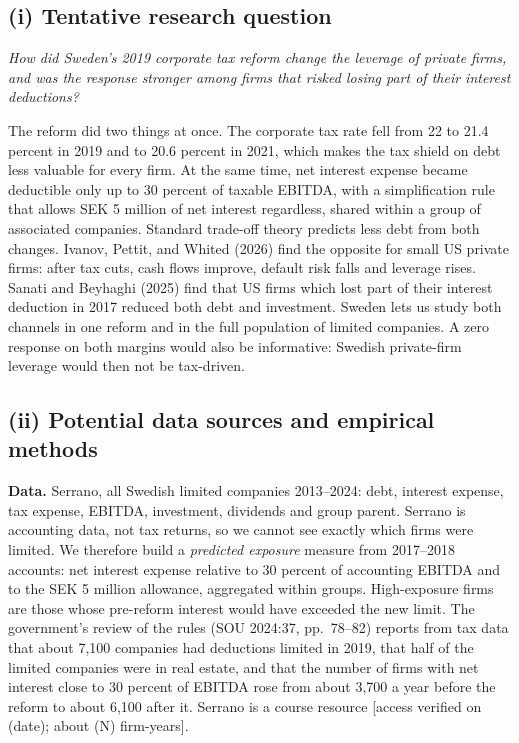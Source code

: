 \documentclass[12pt,a4paper]{article}
\begin{document}
\subsection{(i) Tentative research question}

\emph{How did Sweden's 2019 corporate tax reform change the leverage of private firms, and was the response stronger among firms that risked losing part of their interest deductions?}

The reform did two things at once. The corporate tax rate fell from 22 to 21.4 percent in 2019 and to 20.6 percent in 2021, which makes the tax shield on debt less valuable for every firm. At the same time, net interest expense became deductible only up to 30 percent of taxable EBITDA, with a simplification rule that allows SEK 5 million of net interest regardless, shared within a group of associated companies. Standard trade-off theory predicts less debt from both changes. Ivanov, Pettit, and Whited (2026) find the opposite for small US private firms: after tax cuts, cash flows improve, default risk falls and leverage rises. Sanati and Beyhaghi (2025) find that US firms which lost part of their interest deduction in 2017 reduced both debt and investment. Sweden lets us study both channels in one reform and in the full population of limited companies. A zero response on both margins would also be informative: Swedish private-firm leverage would then not be tax-driven.

\subsection{(ii) Potential data sources and empirical methods}

\textbf{Data.} Serrano, all Swedish limited companies 2013--2024: debt, interest expense, tax expense, EBITDA, investment, dividends and group parent. Serrano is accounting data, not tax returns, so we cannot see exactly which firms were limited. We therefore build a \emph{predicted exposure} measure from 2017--2018 accounts: net interest expense relative to 30 percent of accounting EBITDA and to the SEK 5 million allowance, aggregated within groups. High-exposure firms are those whose pre-reform interest would have exceeded the new limit. The government's review of the rules (SOU 2024:37, pp.~78--82) reports from tax data that about 7,100 companies had deductions limited in 2019, that half of the limited companies were in real estate, and that the number of firms with net interest close to 30 percent of EBITDA rose from about 3,700 a year before the reform to about 6,100 after it. Serrano is a course resource [access verified on (date); about (N) firm-years].
\end{document}
